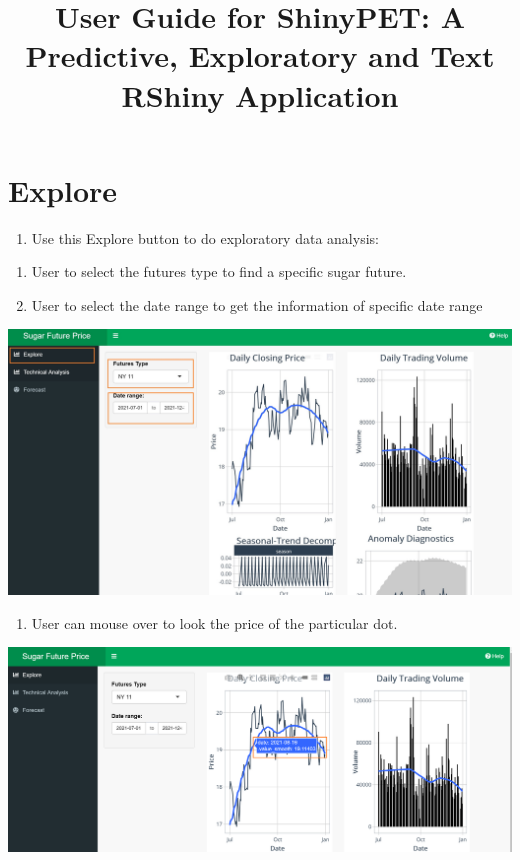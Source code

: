 \documentclass[
  12pt,
]{article}
\title{User Guide for ShinyPET: A Predictive, Exploratory and Text
RShiny Application}
\author{}
\date{\vspace{-2.5em}}
\providecommand{\tightlist}{%
  \setlength{\itemsep}{0pt}\setlength{\parskip}{0pt}}
\begin{document}
\maketitle

{
\setcounter{tocdepth}{3}
\tableofcontents
}
\newpage

\hypertarget{explore}{%
\section{Explore}\label{explore}}

\begin{enumerate}
\def\labelenumi{\arabic{enumi}.}
\tightlist
\item
  Use this Explore button to do exploratory data analysis:
\end{enumerate}

\begin{enumerate}
\def\labelenumi{\arabic{enumi})}
\item
  User to select the futures type to find a specific sugar future.
\item
  User to select the date range to get the information of specific date
  range
\end{enumerate}

\begin{center}\includegraphics[width=1\linewidth]{images/EDA} \end{center}

\begin{enumerate}
\def\labelenumi{\arabic{enumi})}
\setcounter{enumi}{2}
\tightlist
\item
  User can mouse over to look the price of the particular dot.
\end{enumerate}

\begin{center}\includegraphics[width=1\linewidth]{images/EDA2} \end{center}
\end{document}
